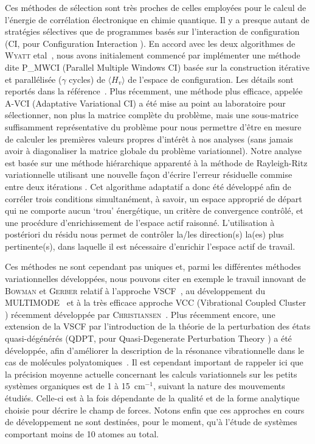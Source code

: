 Ces méthodes de sélection sont très proches de celles employées pour le calcul de l'énergie de corrélation électronique en chimie quantique. Il y a presque autant de stratégies sélectives que de programmes basés sur l'interaction de configuration (CI, pour \og Configuration Interaction \fg{}). En accord avec les deux algorithmes de \textsc{Wyatt} etal~\cite{wyatt1995toward}, nous avons initialement commencé par implémenter une méthode dite P\_MWCI (Parallel Multiple Windows CI) basée sur la construction itérative et parallélisée ($\gamma$ cycles) de $\langle H_{v} \rangle$ de l’espace de configuration. Les détails sont reportés dans la référence~\cite{begue2007comparison}. Plus récemment, une méthode plus efficace, appelée A-VCI (Adaptative Variational CI) a été mise au point au laboratoire pour sélectionner, non plus la matrice complète du problème, mais une sous-matrice suffisamment représentative du problème pour nous permettre d’être en mesure de calculer les premières valeurs propres d’intérêt à nos analyses (sans jamais avoir à diagonaliser la matrice globale du problème variationnel). Notre analyse est basée sur une méthode hiérarchique apparenté à la méthode de Rayleigh-Ritz variationnelle utilisant une nouvelle façon d’écrire l’erreur résiduelle commise entre deux itérations \cite{garnier2016adaptive}. Cet algorithme adaptatif a donc été développé afin de corréler trois conditions simultanément, à savoir, un espace approprié de départ qui ne comporte aucun ‘trou’ énergétique, un critère de convergence contrôlé, et une procédure d’enrichissement de l'espace actif raisonné. L’utilisation à postériori du résidu nous permet de contrôler la/les direction(s) la(es) plus pertinente(s), dans laquelle il est nécessaire d’enrichir l’espace actif de travail.

Ces méthodes ne sont cependant pas uniques et, parmi les différentes méthodes variationnelles développées, nous pouvons citer en exemple le travail innovant de \textsc{Bowman} et \textsc{Gerber} relatif à l'approche VSCF~\cite{bowman1978self,bowman1986self,gerber1988self,gerber1979semiclassical}, au développement du MULTIMODE~\cite{carter2009high} et à la très efficace approche VCC (\og Vibrational Coupled Cluster \fg{}) récemment développée par \textsc{Christiansen}~\cite{sparta2010using}. Plus récemment encore, une extension de la VSCF par l'introduction de la théorie de la perturbation des états quasi-dégénérés (QDPT, pour \og Quasi-Degenerate Perturbation Theory \fg{}) a été développée, afin d'améliorer la description de la résonance vibrationnelle dans le cas de molécules polyatomiques~\cite{yagi2008vibrational}. Il est cependant important de rappeler ici que la précision moyenne actuelle concernant les calculs variationnels sur les petits systèmes organiques est de 1 à 15~cm$^{-1}$, suivant la nature des mouvements étudiés. Celle-ci est à la fois dépendante de la qualité et de la forme analytique choisie pour décrire le champ de forces. Notons enfin que ces approches en cours de développement ne sont destinées, pour le moment, qu’à l’étude de systèmes comportant moins de 10 atomes au total.


